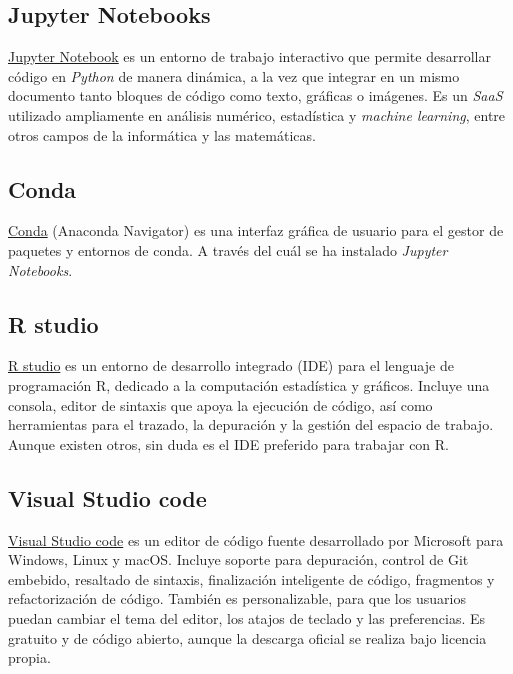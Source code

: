 \subsection{Jupyter Notebooks}\label{herramientas_jupyter}
\href{https://www.jetbrains.com/pycharm/}{Jupyter Notebook} es un entorno de trabajo interactivo que permite desarrollar código en \textit{Python} de manera dinámica, a la vez que integrar en un mismo documento tanto bloques de código como texto, gráficas o imágenes. Es un \textit{SaaS} utilizado ampliamente en análisis numérico, estadística y \textit{machine learning}, entre otros campos de la informática y las matemáticas. 

\subsection{Conda}\label{herramientas_conda}
\href{https://docs.continuum.io/anaconda/navigator/getting-started/ }{Conda} (Anaconda Navigator) es una interfaz gráfica de usuario para el gestor de paquetes y entornos de conda. A través del cuál se ha instalado \textit{ Jupyter Notebooks}.

\subsection{R studio}\label{herramientas_r_studio}
\href{https://www.rstudio.com}{R studio} es un entorno de desarrollo integrado (IDE) para el lenguaje de programación R, dedicado a la computación estadística y gráficos. Incluye una consola, editor de sintaxis que apoya la ejecución de código, así como herramientas para el trazado, la depuración y la gestión del espacio de trabajo. Aunque existen otros, sin duda es el IDE preferido para trabajar con R.

\subsection{Visual Studio code}\label{herramientas_atom}
\href{https://code.visualstudio.com}{Visual Studio code} es un editor de código fuente desarrollado por Microsoft para Windows, Linux y macOS. Incluye soporte para depuración, control de Git embebido, resaltado de sintaxis, finalización inteligente de código, fragmentos y refactorización de código. También es personalizable, para que los usuarios puedan cambiar el tema del editor, los atajos de teclado y las preferencias. Es gratuito y de código abierto, aunque la descarga oficial se realiza bajo licencia propia. 

